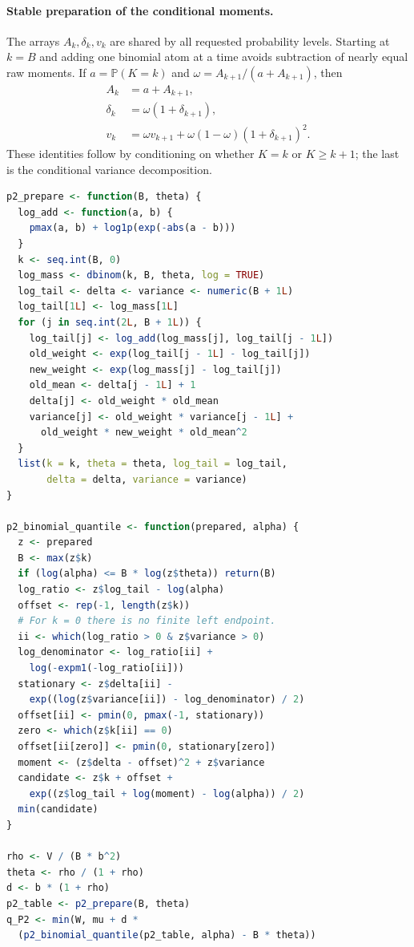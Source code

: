 \documentclass[11pt,letterpaper]{article}
\numberwithin{equation}{section}
\theoremstyle{definition}
\theoremstyle{remark}
\begin{document}
\paragraph{Stable preparation of the conditional moments.}
The arrays $A_k,\delta_k,v_k$ are shared by all requested probability levels.
Starting at $k=B$ and adding one binomial atom at a time avoids subtraction
of nearly equal raw moments. If $a=\mathbb{P}(K=k)$ and
$\omega=A_{k+1}/(a+A_{k+1})$, then
\begin{align*}
 A_k&=a+A_{k+1},\\
 \delta_k&=\omega(1+\delta_{k+1}),\\
 v_k&=\omega v_{k+1}
      +\omega(1-\omega)(1+\delta_{k+1})^2.
\end{align*}
These identities follow by conditioning on whether $K=k$ or $K\ge k+1$;
the last is the conditional variance decomposition.

\begin{lstlisting}[language=R]
p2_prepare <- function(B, theta) {
  log_add <- function(a, b) {
    pmax(a, b) + log1p(exp(-abs(a - b)))
  }
  k <- seq.int(B, 0)
  log_mass <- dbinom(k, B, theta, log = TRUE)
  log_tail <- delta <- variance <- numeric(B + 1L)
  log_tail[1L] <- log_mass[1L]
  for (j in seq.int(2L, B + 1L)) {
    log_tail[j] <- log_add(log_mass[j], log_tail[j - 1L])
    old_weight <- exp(log_tail[j - 1L] - log_tail[j])
    new_weight <- exp(log_mass[j] - log_tail[j])
    old_mean <- delta[j - 1L] + 1
    delta[j] <- old_weight * old_mean
    variance[j] <- old_weight * variance[j - 1L] +
      old_weight * new_weight * old_mean^2
  }
  list(k = k, theta = theta, log_tail = log_tail,
       delta = delta, variance = variance)
}

p2_binomial_quantile <- function(prepared, alpha) {
  z <- prepared
  B <- max(z$k)
  if (log(alpha) <= B * log(z$theta)) return(B)
  log_ratio <- z$log_tail - log(alpha)
  offset <- rep(-1, length(z$k))
  # For k = 0 there is no finite left endpoint.
  ii <- which(log_ratio > 0 & z$variance > 0)
  log_denominator <- log_ratio[ii] +
    log(-expm1(-log_ratio[ii]))
  stationary <- z$delta[ii] -
    exp((log(z$variance[ii]) - log_denominator) / 2)
  offset[ii] <- pmin(0, pmax(-1, stationary))
  zero <- which(z$k[ii] == 0)
  offset[ii[zero]] <- pmin(0, stationary[zero])
  moment <- (z$delta - offset)^2 + z$variance
  candidate <- z$k + offset +
    exp((z$log_tail + log(moment) - log(alpha)) / 2)
  min(candidate)
}

rho <- V / (B * b^2)
theta <- rho / (1 + rho)
d <- b * (1 + rho)
p2_table <- p2_prepare(B, theta)
q_P2 <- min(W, mu + d *
  (p2_binomial_quantile(p2_table, alpha) - B * theta))
\end{lstlisting}
\end{document}
